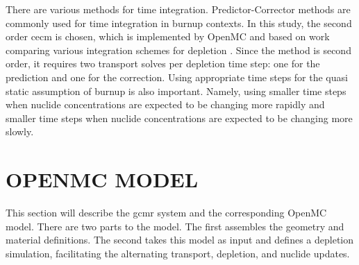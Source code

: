 \documentclass[letterpaper]{physor2024}
\begin{document}
There are various methods for time integration. Predictor-Corrector methods are commonly used for time integration in burnup contexts. In this study, the second order \gls{cecm} is chosen, which is implemented by OpenMC and based on work comparing various integration schemes for depletion \cite{isotalo_comparison_2015}. Since the method is second order, it requires two transport solves per depletion time step: one for the prediction and one for the correction. Using appropriate time steps for the quasi static assumption of burnup is also important. Namely, using smaller time steps when nuclide concentrations are expected to be changing more rapidly and smaller time steps when nuclide concentrations are expected to be changing more slowly.

\section{OPENMC MODEL}\label{sec:openmc_model}
This section will describe the \gls{gcmr} system and the corresponding OpenMC model. There are two parts to the model. The first assembles the geometry and material definitions. The second takes this model as input and defines a depletion simulation, facilitating the alternating transport, depletion, and nuclide updates.
\end{document}
